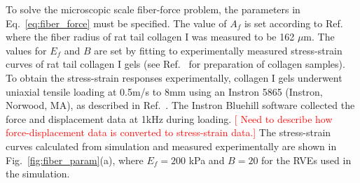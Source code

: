 \documentclass[10pt]{asme2ej}
\begin{document}
To solve the microscopic scale fiber-force problem, the parameters in Eq.\ \eqref{eq:fiber_force} must be specified. The value of $A_f$ is set according to Ref.\  where the fiber radius of rat tail collagen I was measured to be 162 $\mu$m. The values for $E_f$ and $B$ are set by fitting to experimentally measured stress-strain curves of rat tail collagen I gels (see Ref.\  for preparation of collagen samples). To obtain the stress-strain responses experimentally, collagen I gels underwent uniaxial tensile loading at 0.5m/s to 8mm using an Instron 5865 (Instron, Norwood, MA), as described in Ref.\ . The Instron Bluehill software collected the force and displacement data at 1kHz during loading. \textcolor{red}{[ Need to describe how force-displacement data is converted to stress-strain data.]} The stress-strain curves calculated from simulation and measured experimentally are shown in Fig.\ \ref{fig:fiber_param}(a), where $E_f = 200$ kPa and $B=20$ for the RVEs used in the simulation. 
%
\end{document}
